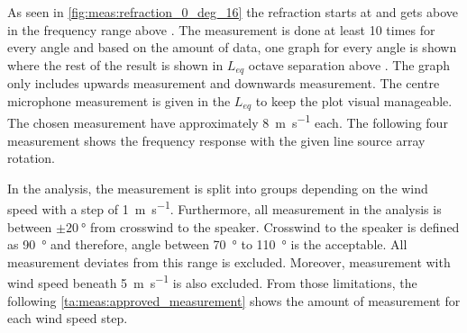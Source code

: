 
As seen in \autoref{fig:meas:refraction_0_deg_16} the refraction starts at  and gets above  in the frequency range above . The measurement is done at least 10 times for every angle and based on the amount of data, one graph for every angle is shown where the rest of the result is shown in $L_{eq}$ octave separation above . The graph only includes upwards measurement and downwards measurement. The centre microphone measurement is given in the $L_{eq}$  to keep the plot visual manageable. The chosen measurement have approximately \SI{8}{\meter\per\second} each. The following four measurement shows the frequency response with the given line source array rotation.


In the analysis, the measurement is split into groups depending on the wind speed with a step of \SI{1}{\meter\per\second}. Furthermore, all measurement in the analysis is between $\pm\SI{20}{\degree}$ from crosswind to the speaker. Crosswind to the speaker is defined as \SI{90}{\degree} and therefore, angle between \SI{70}{\degree} to \SI{110}{\degree} is the acceptable. All measurement deviates from this range is excluded. Moreover, measurement with wind speed beneath \SI{5}{\meter\per\second} is also excluded. From those limitations, the following \autoref{ta:meas:approved_measurement} shows the amount of measurement for each wind speed step. 


